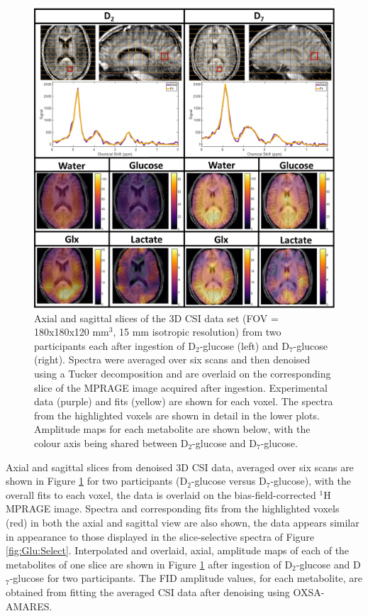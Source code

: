\documentclass[class=article, crop=false]{standalone}
\begin{document}
\begin{figure}
    \centering
    \includegraphics[width = 1\textwidth]{Figures/Glucose/CSI.png}
    \caption{Axial and sagittal slices of the 3D CSI data set (FOV = 180x180x120 mm$^3$, 15 mm isotropic resolution) from two participants each after ingestion of D$_2$-glucose (left) and D$_7$-glucose (right). Spectra were averaged over six scans and then denoised using a Tucker decomposition and are overlaid on the corresponding slice of the MPRAGE image acquired after ingestion. Experimental data (purple) and fits (yellow) are shown for each voxel. The spectra from the highlighted voxels are shown in detail in the lower plots. Amplitude maps for each metabolite are shown below, with the colour axis being shared between D$_2$-glucose and D$_7$-glucose.}
    \label{fig:Glu:CSI}
\end{figure}

Axial and sagittal slices from denoised 3D CSI data, averaged over six scans are shown in Figure \ref{fig:Glu:CSI} for two participants (D$_2$-glucose versus D$_7$-glucose), with the overall fits to each voxel, the data is overlaid on the bias-field-corrected $^1$H MPRAGE image. Spectra and corresponding fits from the highlighted voxels (red) in both the axial and sagittal view are also shown, the data appears similar in appearance to those displayed in the slice-selective spectra of Figure \ref{fig:Glu:Select}. Interpolated and overlaid, axial, amplitude maps of each of the metabolites of one slice are shown in Figure \ref{fig:Glu:CSI} after ingestion of D$_2$-glucose and D$_7$-glucose for two participants. The FID amplitude values, for each metabolite, are obtained from fitting the averaged CSI data after denoising using OXSA-AMARES\cite{Vanhamme1997ImprovedKnowledge, Purvis2017OXSA:MATLAB}.
\end{document}
